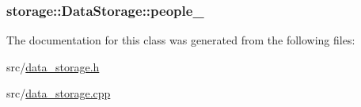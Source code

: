 \label{da/db4/classstorage_1_1DataStorage_a08dbec98bdd6b7c3e6623a8bbe72235c}
\hypertarget{classstorage_1_1DataStorage_a8c32de002329fa6018a0957c925cf183}{
\subsubsection[{people\_\-}]{ {\bf storage::DataStorage::people\_\-}}}
\label{da/db4/classstorage_1_1DataStorage_a8c32de002329fa6018a0957c925cf183}


The documentation for this class was generated from the following files:\begin{DoxyCompactItemize}
\item 
src/\hyperlink{data__storage_8h}{data\_\-storage.h}\item 
src/\hyperlink{data__storage_8cpp}{data\_\-storage.cpp}\end{DoxyCompactItemize}
